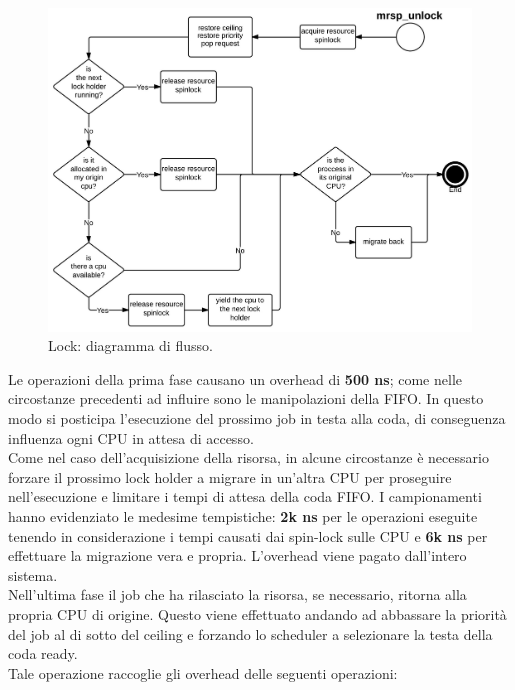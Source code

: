 {\begin{figure}
\includegraphics[width=\linewidth]{images/mrsp_unlock.jpeg}
\caption{Lock: diagramma di flusso.}
\label{fig:mrsplock}
\end{figure}

\noindent Le operazioni della prima fase causano un overhead di \textbf{500 ns}; come nelle circostanze precedenti ad influire sono le manipolazioni della FIFO. In questo modo si posticipa l'esecuzione del prossimo job in testa alla coda, di conseguenza influenza ogni CPU in attesa di accesso.\\

\noindent Come nel caso dell'acquisizione della risorsa, in alcune circostanze è necessario forzare il prossimo lock holder a migrare in un'altra CPU per proseguire nell'esecuzione e limitare i tempi di attesa della coda FIFO. I campionamenti hanno evidenziato le medesime tempistiche: \textbf{2k ns} per le operazioni eseguite tenendo in considerazione i tempi causati dai spin-lock sulle CPU e \textbf{6k ns} per effettuare la migrazione vera e propria. L'overhead viene pagato dall'intero sistema.\\

\noindent Nell'ultima fase il job che ha rilasciato la risorsa, se necessario, ritorna alla propria CPU di origine. Questo viene effettuato andando ad abbassare la priorità del job al di sotto del ceiling e forzando lo scheduler a selezionare la testa della coda ready.\\

\noindent Tale operazione raccoglie gli overhead delle seguenti operazioni:

}
